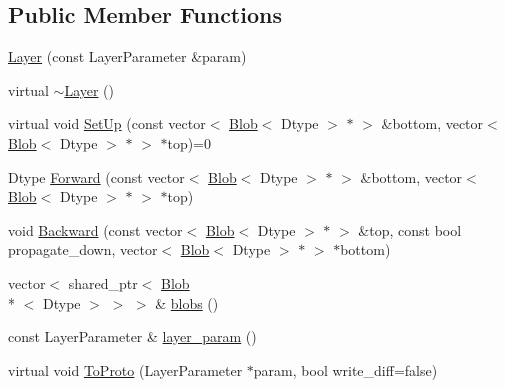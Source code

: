\subsection*{Public Member Functions}
\begin{DoxyCompactItemize}
\item 
\hyperlink{classcaffe_1_1_layer_a7b4e4ccea08c7b8b15acc6829d5735f6}{Layer} (const Layer\+Parameter \&param)
\item 
virtual \hyperlink{classcaffe_1_1_layer_aa9db88a6b9bdad8fceb1f79ea1cc2ef4}{$\sim$\+Layer} ()
\item 
virtual void \hyperlink{classcaffe_1_1_layer_abd13c6489c13953b4fbcfcf6880835d0}{Set\+Up} (const vector$<$ \hyperlink{classcaffe_1_1_blob}{Blob}$<$ Dtype $>$ $\ast$ $>$ \&bottom, vector$<$ \hyperlink{classcaffe_1_1_blob}{Blob}$<$ Dtype $>$ $\ast$ $>$ $\ast$top)=0
\item 
Dtype \hyperlink{classcaffe_1_1_layer_a31d00947960a1334be6e45c9a43d8d58}{Forward} (const vector$<$ \hyperlink{classcaffe_1_1_blob}{Blob}$<$ Dtype $>$ $\ast$ $>$ \&bottom, vector$<$ \hyperlink{classcaffe_1_1_blob}{Blob}$<$ Dtype $>$ $\ast$ $>$ $\ast$top)
\item 
void \hyperlink{classcaffe_1_1_layer_a4bcd2013ef9822dd21d122c97a87da83}{Backward} (const vector$<$ \hyperlink{classcaffe_1_1_blob}{Blob}$<$ Dtype $>$ $\ast$ $>$ \&top, const bool propagate\+\_\+down, vector$<$ \hyperlink{classcaffe_1_1_blob}{Blob}$<$ Dtype $>$ $\ast$ $>$ $\ast$bottom)
\item 
vector$<$ shared\+\_\+ptr$<$ \hyperlink{classcaffe_1_1_blob}{Blob}\\*
$<$ Dtype $>$ $>$ $>$ \& \hyperlink{classcaffe_1_1_layer_aaf4524ce8641a30a8a4784aee1b2b4c8}{blobs} ()
\item 
const Layer\+Parameter \& \hyperlink{classcaffe_1_1_layer_a6478a1086c96f32d928bc40f336cbb81}{layer\+\_\+param} ()
\item 
virtual void \hyperlink{classcaffe_1_1_layer_a4a1754828dda22cc8daa2f63377f3579}{To\+Proto} (Layer\+Parameter $\ast$param, bool write\+\_\+diff=false)
\end{DoxyCompactItemize}
